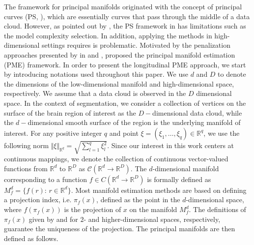 \documentclass[11pt,reqno]{article}
\theoremstyle{definition}
\begin{document}
The framework for principal manifolds originated with the concept of principal curves (PS, \cite{hastiePrincipalCurves1989}), which are essentially curves that pass through the middle of a data cloud. However, as pointed out by \cite{duchamp1996extremal}, the PS framework in \cite{hastiePrincipalCurves1989} has limitations such as the model complexity selection. In addition, applying the methods in high-dimensional settings requires is problematic. Motivated by the penalization approaches presented by in \cite{kegl2000learning} and \cite{smolaRegularizedPrincipalManifolds2001}, \cite{mengPrincipalManifoldEstimation2021} proposed the principal manifold estimation (PME) framework. In order to present the longitudinal PME approach, we start by introducing notations used throughout this paper. We use $d$ and $D$ to denote the dimensions of the low-dimensional manifold and high-dimensional space, respectively. We assume that a data cloud is observed in the $D$ dimensional space. In the context of segmentation, we consider a collection of vertices on the surface of the brain region of interest as the $D-$dimensional data cloud, while the $d-$dimensional smooth surface of the region is the underlying manifold of interest. For any positive integer $q$ and point $\xi=(\xi_1,\ldots,\xi_q)\in\mathbb{R}^q$, we use the following norm $\Vert \xi\Vert_{\mathbb{R}^q}=\sqrt{\sum_{l=1}^q \xi_l^2}$. Since our interest in this work centers at continuous mappings, we denote the collection of continuous vector-valued functions from $\mathbb{R}^d$ to $\mathbb{R}^D$ as $\mathcal{C}(\mathbb{R}^{d} \to \mathbb{R}^{D})$. The $d$-dimensional manifold corresponding to a function $f \in C(\mathbb{R}^{d} \to \mathbb{R}^{D})$ is formally defined as $M_f^d=\{f(r):\,r\in\mathbb{R}^d\}$. Most manifold estimation methods are based on defining a projection index, i.e. $\pi_f(x)$, defined as the point in the $d$-dimensional space, where $f(\pi_f(x))$ is the projection of $x$ on the manifold $M_f^d$. The definitions of $\pi_f(x)$ given by \cite{hastiePrincipalCurves1989} and \cite{mengPrincipalManifoldEstimation2021} for $2$- and higher-dimensional spaces, respectively, guarantee the uniqueness of the projection. The principal manifolds are then defined as follows. 
\end{document}
